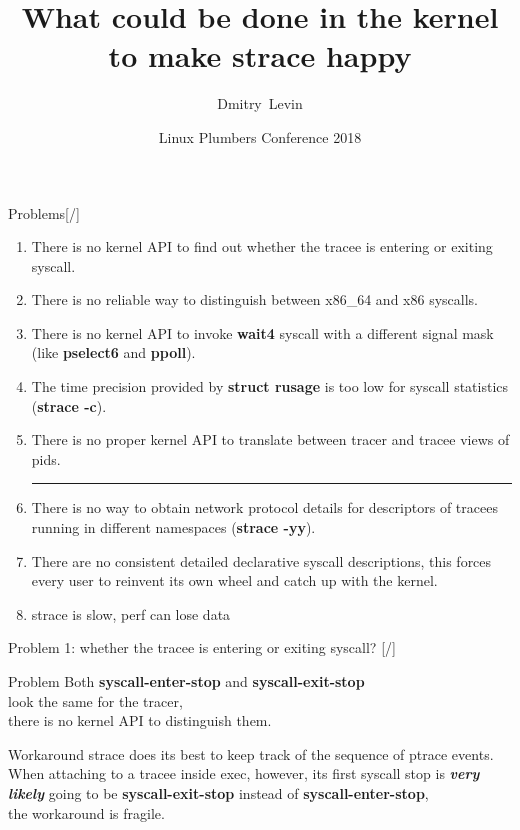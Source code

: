 \documentclass[unicode,aspectratio=169]{beamer}
\title{\Huge What could be done in the kernel \\ to make strace happy}
\author{\Large Dmitry~Levin}
\date{\Large Linux Plumbers Conference 2018}
\begin{document}
\begin{frame}
\titlepage
\end{frame}

\begin{frame}{Problems\hfill [\insertframenumber/\inserttotalframenumber]}
\begin{enumerate}
\large
\item There is no kernel API to find out whether the tracee is entering or exiting syscall.
\item There is no reliable way to distinguish between x86\_64 and x86 syscalls.
\item There is no kernel API to invoke \textbf{wait4} syscall with a different signal mask (like \textbf{pselect6} and \textbf{ppoll}).
\item The time precision provided by \textbf{struct rusage} is too low for syscall statistics (\textbf{strace -c}).
\item There is no proper kernel API to translate between tracer and tracee views of pids.

\smallskip
\hrule
\smallskip

\item There is no way to obtain network protocol details for descriptors of tracees running in different namespaces (\textbf{strace -yy}).
\item There are no consistent detailed declarative syscall descriptions, this forces every user to reinvent its own wheel and catch up with the kernel.
\item strace is slow, perf can lose data
\end{enumerate}
\end{frame}

\begin{frame}{Problem 1: whether the tracee is entering or exiting syscall? \hfill [\insertframenumber/\inserttotalframenumber]}
\LARGE

\begin{block}{Problem}
Both \textbf{syscall-enter-stop} and \textbf{syscall-exit-stop} \\
look the same for the tracer, \\
there is no kernel API to distinguish them.
\end{block}

\begin{block}{Workaround}
strace does its best to keep track of the sequence of ptrace events.
When attaching to a tracee inside exec, however,
its first syscall stop is \textbf{\textit{very likely}} going to be
\textbf{syscall-exit-stop} instead of \textbf{syscall-enter-stop}, \\
the workaround is fragile.
\end{block}
\end{frame}
\end{document}
